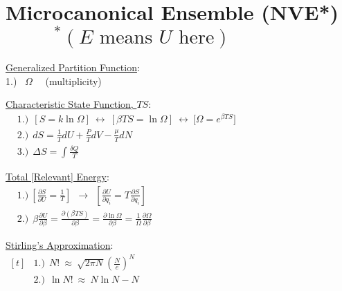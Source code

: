 \documentclass[12pt]{article}
\begin{document}
\section{Microcanonical Ensemble (NVE*) \(\hspace{30pt} {\scriptstyle^*(E \text{ means } U \text{ here})}\)}
\begin{minipage}[t]{.58\textwidth}
    \underline{Generalized Partition Function}: \\[5pt]
    1.) \ \(\Omega\) \ \ {\scriptsize(multiplicity)}

    \vspace{10pt}
    \underline{Characteristic State Function, \(TS\)}: \\[7pt]
    \(\begin{aligned}
        &1.)\ \ [S = k \ln{\Omega}] \ \leftrightarrow \ [\beta TS = \ln{\Omega}]
            \ \leftrightarrow \ \Big[ \Omega = e^{\beta TS} \Big]\\[2pt]
        &2.)\ \ dS = \tfrac{1}{T} dU + \tfrac{P}{T} dV - \tfrac{\mu}{T} dN\\[5pt]
        &3.)\ \ \Delta S = {\textstyle\int} \tfrac{\delta Q}{T}
    \end{aligned}\)
\end{minipage}
\begin{minipage}[t]{.40\textwidth}
    \underline{Total [Relevant] Energy}: \\[5pt]
    \(\begin{aligned}
        &1.)\ \left[ \tfrac{\partial S}{\partial U} = \tfrac{1}{T} \right] \ \ \rightarrow \ \ 
            \left[ \tfrac{\partial U}{\partial q_i} = T \tfrac{\partial S}{\partial q_i} \right] \\[1pt]
        &2.)\ \ \beta \tfrac{\partial U}{\partial \beta} = \tfrac{\partial (\beta TS)}{\partial \beta} 
            = \tfrac{\partial \ln{\Omega}}{\partial \beta} 
            = \tfrac{1}{\Omega} \tfrac{\partial \Omega}{\partial \beta}
    \end{aligned}\)

    \vspace{12pt}
    \underline{Stirling's Approximation}: \\[7pt]
    \(\begin{aligned}[t]
        &1.)\ \ N! \ \approx\ \sqrt{2\pi N} \left( \tfrac{N}{e} \right)^N\\[2pt]
        &2.)\ \ \ln{N!} \ \approx\ N \ln{N} - N
    \end{aligned}\)
\end{minipage}
\end{document}
